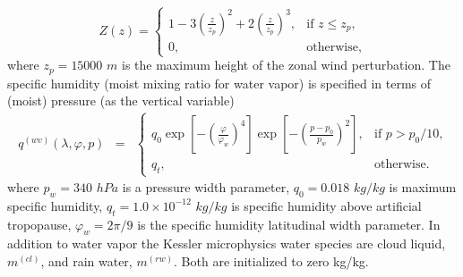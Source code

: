\documentclass{agujournal}
\begin{document}
\begin{equation}
Z(z) = \left\{ \begin{array}{ll} \displaystyle 1 - 3 \left( \frac{z}{z_p} \right)^2 + 2 \left( \frac{z}{z_p} \right)^3, & \mbox{if $z \leq z_p$,} \\ 0, & \mbox{otherwise,} \end{array} \right.
\end{equation}
where $z_p=15000$ $m$ is the maximum height of the zonal wind perturbation. The specific humidity (moist mixing ratio for water vapor) is specified in terms of (moist) pressure (as the vertical variable)
\begin{eqnarray}
q^{(wv)}(\lambda, \varphi, p) &=& \left\{ \begin{array}{ll} q_0 \exp\left[- \left(\frac{\varphi}{\varphi_{w}}\right)^4 \right] \exp\left[- \left(\frac{p-p_0}{p_{w}}\right)^2  \right], & \mbox{if $p > p_0 / 10$,} \\ q_{t}, & \mbox{otherwise.} \end{array} \right.
\end{eqnarray} 
where $p_w=340$ $hPa$ is a pressure width parameter, $q_0=0.018$ $kg/kg$ is maximum specific humidity, $q_t=1.0\times 10^{-12}$ $kg/kg$ is specific humidity above artificial tropopause, $\varphi_{w}=2\pi/9$ is the specific humidity latitudinal width parameter. In addition to water vapor the Kessler microphysics water species are cloud liquid, $m^{(cl)}$, and rain water, $m^{(rw)}$. Both are initialized to zero kg/kg.


%
%

%
\end{document}
